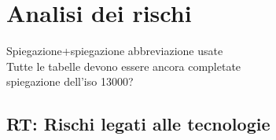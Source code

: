 
\begin{comment}
\begin{table}[h!]
\centering
\renewcommand{\arraystretch}{1.5} %
\begin{tabularx}{\textwidth}{|X|X|}\hline
\rowcolor[HTML]{FFD700} 
\multicolumn{2}{|c|}{\textbf{Tipologia del rischio}} \\ \hline
\textbf{Descrizione} & Descrizione del rischio. \\ \hline
\textbf{Probabilità di occorrenza} & Probabilità di occorrenza (Alta/Media/Bassa) \\ \hline
\textbf{Pericolosità} & Pericolosità(Alta/Media/Bassa) \\ \hline
\textbf{Conseguenze} & Conseguenze del rischio \\ \hline
\textbf{Mitigazioni possibili} & Conseguenze prese \\ \hline
\end{tabularx}
\caption{\textbf{Tipologia del rischio con il numero identificativo}: Descrizione rischio}
\end{table}
\end{comment}

\section{Analisi dei rischi}
Spiegazione+spiegazione abbreviazione usate\\
Tutte le tabelle devono essere ancora completate\\
spiegazione dell'iso 13000?

\subsection{RT: Rischi legati alle tecnologie}

